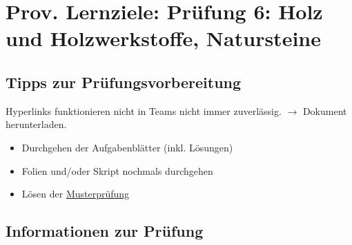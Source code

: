 




\newcommand{\blattname}{Prov. Lernziele: Prüfung 6: Holz und Holzwerkstoffe, Natursteine}
\newcommand{\nrPruefung}{sechsten}
\newcommand{\Added}[1]{\textcolor{blue}{#1}}



\section*{\blattname}
\subsection*{Tipps zur Prüfungsvorbereitung}
Hyperlinks funktionieren nicht in Teams nicht immer zuverlässig. $\rightarrow$ Dokument herunterladen.
\begin{itemize}
    \item Durchgehen der Aufgabenblätter (inkl. Lösungen)

    \item Folien und/oder Skript nochmals durchgehen
    \item Lösen der \href{https://www.classtime.com/code/CXR262}{Musterprüfung}
\end{itemize}

\subsection*{Informationen zur Prüfung}

